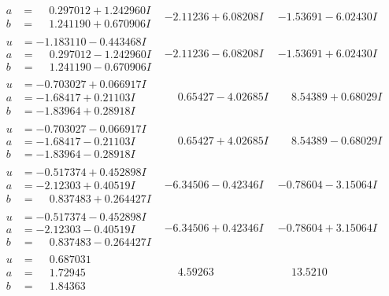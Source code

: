 \documentclass[1p]{elsarticle_modified}
\theoremstyle{definition}
\begin{document}
$$\begin{array}{c|c|c}
\begin{aligned}
a &= \phantom{-}0.297012 + 1.242960 I \\
b &= \phantom{-}1.241190 + 0.670906 I\end{aligned}
 & -2.11236 + 6.08208 I & -1.53691 - 6.02430 I \\ \hline\begin{aligned}
u &= -1.183110 - 0.443468 I \\
a &= \phantom{-}0.297012 - 1.242960 I \\
b &= \phantom{-}1.241190 - 0.670906 I\end{aligned}
 & -2.11236 - 6.08208 I & -1.53691 + 6.02430 I \\ \hline\begin{aligned}
u &= -0.703027 + 0.066917 I \\
a &= -1.68417 + 0.21103 I \\
b &= -1.83964 + 0.28918 I\end{aligned}
 & \phantom{-}0.65427 - 4.02685 I & \phantom{-}8.54389 + 0.68029 I \\ \hline\begin{aligned}
u &= -0.703027 - 0.066917 I \\
a &= -1.68417 - 0.21103 I \\
b &= -1.83964 - 0.28918 I\end{aligned}
 & \phantom{-}0.65427 + 4.02685 I & \phantom{-}8.54389 - 0.68029 I \\ \hline\begin{aligned}
u &= -0.517374 + 0.452898 I \\
a &= -2.12303 + 0.40519 I \\
b &= \phantom{-}0.837483 + 0.264427 I\end{aligned}
 & -6.34506 - 0.42346 I & -0.78604 - 3.15064 I \\ \hline\begin{aligned}
u &= -0.517374 - 0.452898 I \\
a &= -2.12303 - 0.40519 I \\
b &= \phantom{-}0.837483 - 0.264427 I\end{aligned}
 & -6.34506 + 0.42346 I & -0.78604 + 3.15064 I \\ \hline\begin{aligned}
u &= \phantom{-}0.687031\phantom{ +0.000000I} \\
a &= \phantom{-}1.72945\phantom{ +0.000000I} \\
b &= \phantom{-}1.84363\phantom{ +0.000000I}\end{aligned}
 & \phantom{-}4.59263\phantom{ +0.000000I} & \phantom{-}13.5210\phantom{ +0.000000I} \\ \hline\begin{aligned}

\end{aligned}
\end{array}$$
\end{document}
